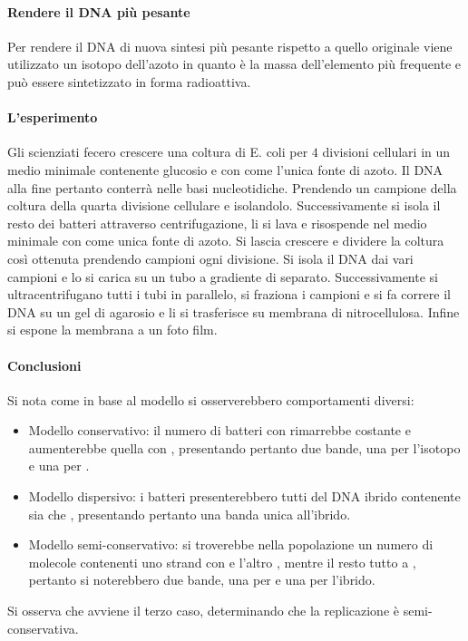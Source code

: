 \paragraph{Rendere il DNA pi\`u pesante}
Per rendere il DNA di nuova sintesi pi\`u pesante rispetto a quello originale viene utilizzato un isotopo dell'azoto \emph{} in quanto \`e la massa dell'elemento pi\`u frequente
e pu\`o essere sintetizzato in forma radioattiva.
\paragraph{L'esperimento}
Gli scienziati fecero crescere una coltura di E. coli per $4$ divisioni cellulari in un medio minimale contenente glucosio e con \emph{} come l'unica fonte di azoto. Il 
DNA alla fine pertanto conterr\`a \emph{} nelle basi nucleotidiche. Prendendo un campione della coltura della quarta divisione cellulare e isolandolo. Successivamente si isola
il resto dei batteri attraverso centrifugazione, li si lava e risospende nel medio minimale con \emph{} come unica fonte di azoto. Si lascia crescere e dividere la coltura
cos\`i ottenuta prendendo campioni ogni divisione. Si isola il DNA dai vari campioni e lo si carica su un tubo a gradiente di \emph{} separato. Successivamente si 
ultracentrifugano tutti i tubi in parallelo, si fraziona i campioni e si fa correre il DNA su un gel di agarosio e li si trasferisce su membrana di nitrocellulosa. Infine si espone la 
membrana a un foto film. 
\paragraph{Conclusioni}
Si nota come in base al modello si osserverebbero comportamenti diversi:
\begin{itemize}
	\item Modello conservativo: il numero di batteri con \emph{} rimarrebbe costante e aumenterebbe quella con \emph{}, presentando pertanto due bande, una per 
		l'isotopo e una per \emph{}.
	\item Modello dispersivo: i batteri presenterebbero tutti del DNA ibrido contenente sia \emph{} che \emph{}, presentando pertanto una banda unica all'ibrido.
	\item Modello semi-conservativo: si troverebbe nella popolazione un numero di molecole contenenti uno strand con \emph{} e l'altro \emph{}, mentre il resto tutto 
		a \emph{}, pertanto si noterebbero due bande, una per \emph{} e una per l'ibrido.
\end{itemize}
Si osserva che avviene il terzo caso, determinando che la replicazione \`e semi-conservativa.
